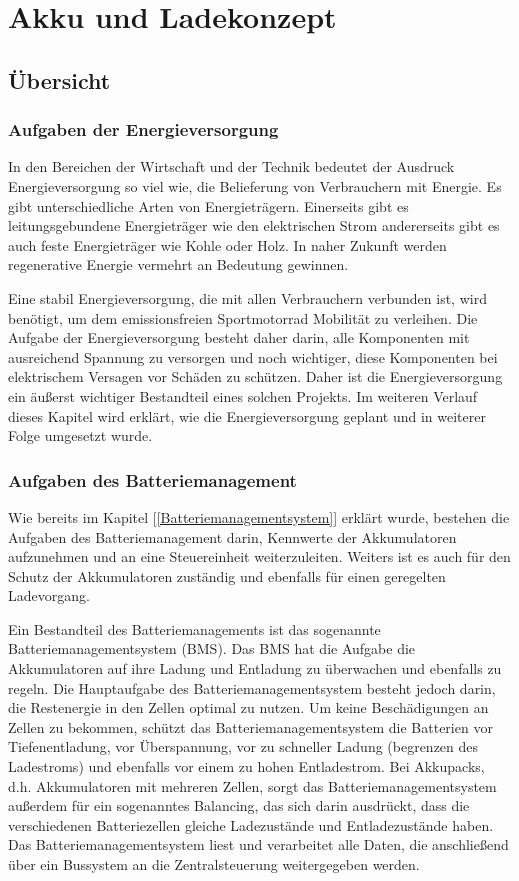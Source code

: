 \chapter{Akku und Ladekonzept}  \label{Akku und Ladekonzept}

\section{Übersicht}


\subsection{Aufgaben der Energieversorgung}
In den Bereichen der Wirtschaft und der Technik bedeutet der Ausdruck Energieversorgung so viel wie, die Belieferung von Verbrauchern mit Energie. Es gibt unterschiedliche Arten von Energieträgern. Einerseits gibt es leitungsgebundene Energieträger wie den elektrischen Strom andererseits gibt es auch feste Energieträger wie Kohle oder Holz. In naher Zukunft werden regenerative Energie vermehrt an Bedeutung gewinnen.

Eine stabil Energieversorgung, die mit allen Verbrauchern verbunden ist, wird benötigt, um dem emissionsfreien Sportmotorrad Mobilität zu verleihen. Die Aufgabe der Energieversorgung besteht daher darin, alle Komponenten mit ausreichend Spannung zu versorgen und noch wichtiger, diese Komponenten bei elektrischem Versagen vor Schäden zu schützen. Daher ist die Energieversorgung ein äußerst wichtiger Bestandteil eines solchen Projekts. Im weiteren Verlauf dieses Kapitel wird erklärt, wie die Energieversorgung geplant und in weiterer Folge umgesetzt wurde.

\subsection{Aufgaben des Batteriemanagement}
Wie bereits im Kapitel [\ref{Batteriemanagementsystem}] erklärt wurde, bestehen die Aufgaben des Batteriemanagement darin, Kennwerte der Akkumulatoren aufzunehmen und an eine Steuereinheit weiterzuleiten. Weiters ist es auch für den Schutz der Akkumulatoren zuständig und ebenfalls für einen geregelten Ladevorgang.

Ein Bestandteil des Batteriemanagements ist das sogenannte Batteriemanagementsystem (BMS). Das BMS hat die Aufgabe die Akkumulatoren auf ihre Ladung und Entladung zu überwachen und ebenfalls zu regeln. Die Hauptaufgabe des Batteriemanagementsystem besteht jedoch darin, die Restenergie in den Zellen optimal zu nutzen. Um keine Beschädigungen an Zellen zu bekommen, schützt das Batteriemanagementsystem die Batterien vor Tiefenentladung, vor Überspannung, vor zu schneller Ladung (begrenzen des Ladestroms) und ebenfalls vor einem zu hohen Entladestrom. Bei Akkupacks, d.h. Akkumulatoren mit mehreren Zellen, sorgt das Batteriemanagementsystem außerdem für ein sogenanntes Balancing, das sich darin ausdrückt, dass die verschiedenen Batteriezellen gleiche Ladezustände und Entladezustände haben. Das Batteriemanagementsystem liest und verarbeitet alle Daten, die anschließend über ein Bussystem an die Zentralsteuerung weitergegeben werden.

